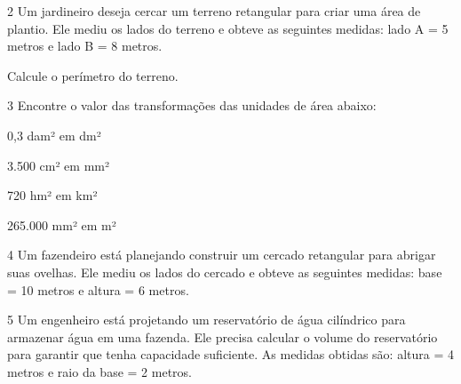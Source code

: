 \num{2} Um jardineiro deseja cercar um terreno retangular para criar uma área
de plantio. Ele mediu os lados do terreno e obteve as seguintes medidas:
lado A = 5 metros e lado B = 8 metros.

\pagebreak
Calcule o perímetro do terreno.


\num{3} Encontre o valor das transformações das unidades de área abaixo:

\begin{escolha}[itemsep=0pt]

\item 0,3 dam² em dm² 

\item 3.500 cm² em mm² 

\item 720 hm² em km² 

\item 265.000 mm² em m² 

\end{escolha}


\num{4} Um fazendeiro está planejando construir um cercado retangular para
abrigar suas ovelhas. Ele mediu os lados do cercado e obteve as
seguintes medidas: base = 10 metros e altura = 6 metros.


\num{5} Um engenheiro está projetando um reservatório de água cilíndrico para
armazenar água em uma fazenda. Ele precisa calcular o volume do
reservatório para garantir que tenha capacidade suficiente. As medidas
obtidas são: altura = 4 metros e raio da base = 2 metros.

